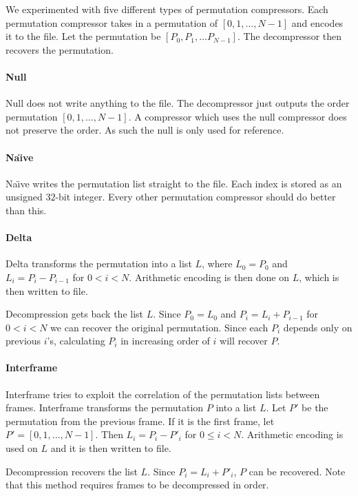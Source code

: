 \documentclass[a4paper]{report}
\begin{document}
We experimented with five different types of permutation compressors. Each
permutation compressor takes in a permutation of $[0,1,\dots,N-1]$ and encodes
it to the file. Let the permutation be $[P_0, P_1, \dots P_{N-1}]$. The
decompressor then recovers the permutation.

\paragraph{Null}
Null does not write anything to the file. The decompressor just outputs the
order permutation $[0,1,\dots,N-1]$. A compressor which uses the null
compressor does not preserve the order. As such the null is only used for
reference.

\paragraph{Na\"{\i}ve}
Na\"{\i}ve writes the permutation list straight to the file. Each index is
stored as an unsigned $32$-bit integer. Every other permutation compressor
should do better than this.

\paragraph{Delta}
Delta transforms the permutation into a list $L$, where $L_0 = P_0$ and $L_i =
P_i - P_{i-1}$ for $0 < i < N$. Arithmetic encoding is then done on $L$, which
is then written to file.

Decompression gets back the list $L$. Since $P_0 = L_0$ and $P_i = L_i +
P_{i-1}$ for $0 < i < N$ we can recover the original permutation. Since each
$P_i$ depends only on previous $i$'s, calculating $P_i$ in increasing order of
$i$ will recover $P$.

\paragraph{Interframe}
Interframe tries to exploit the correlation of the permutation lists between
frames. Interframe transforms the permutation $P$ into a list $L$. Let $P'$ be
the permutation from the previous frame. If it is the first frame, let $P' =
[0,1,\dots,N-1]$. Then $L_i = P_i - P'_i$ for $0 \le i < N$. Arithmetic
encoding is used on $L$ and it is then written to file.

Decompression recovers the list $L$. Since $P_i = L_i + P'_i$, $P$ can be
recovered. Note that this method requires frames to be decompressed in order.
\end{document}
